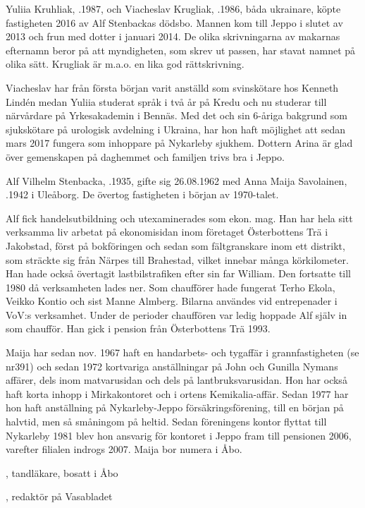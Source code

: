 %
Yuliia Kruhliak, .1987, och Viacheslav Krugliak, .1986, båda ukrainare, köpte fastigheten 2016 av Alf Stenbackas dödsbo. Mannen kom till Jeppo i slutet av 2013 och frun med dotter i januari 2014. De olika skrivningarna av makarnas efternamn beror på att myndigheten, som skrev ut passen, har stavat namnet på olika sätt. Krugliak är m.a.o. en lika god rättskrivning.
\begin{jhchildren}
  \item {}
\end{jhchildren}
Viacheslav har från första början varit anställd som svinskötare hos Kenneth Lindén medan Yuliia studerat språk i två år på Kredu och nu studerar till närvårdare på Yrkesakademin i Bennäs. Med det och sin 6-åriga bakgrund som sjukskötare på urologisk avdelning i Ukraina, har hon haft möjlighet att sedan mars 2017 fungera som inhoppare på Nykarleby sjukhem. Dottern Arina är glad över gemenskapen på daghemmet och familjen trivs bra i Jeppo.


%
Alf Vilhelm Stenbacka, .1935, gifte sig 26.08.1962 med Anna Maija Savolainen, .1942 i Uleåborg. De övertog fastigheten i början av 1970-talet.

Alf fick handelsutbildning och utexaminerades som ekon. mag. Han har hela sitt verksamma liv arbetat på ekonomisidan inom företaget Österbottens Trä i Jakobstad, först på bokföringen och sedan som fältgranskare inom ett distrikt, som sträckte sig från Närpes till Brahestad, vilket innebar många körkilometer. Han hade också övertagit lastbilstrafiken efter sin far William. Den fortsatte till 1980 då verksamheten lades ner. Som chaufförer hade fungerat Terho Ekola, Veikko Kontio och sist Manne Almberg. Bilarna användes vid entrepenader i VoV:s verksamhet. Under de perioder chauffören var ledig hoppade Alf själv in som chaufför. Han gick i pension från Österbottens Trä 1993.

Maija har sedan nov. 1967 haft en handarbets- och tygaffär i grannfastigheten (se nr391) och sedan 1972 kortvariga anställningar på John och Gunilla Nymans affärer, dels inom matvarusidan och dels på lantbruksvarusidan. Hon har också haft korta inhopp i Mirkakontoret och i ortens Kemikalia-affär. Sedan 1977 har hon  haft anställning på Nykarleby-Jeppo försäkringsförening, till en början på halvtid, men så småningom på heltid. Sedan föreningens kontor flyttat till Nykarleby 1981 blev hon ansvarig för kontoret i Jeppo fram till pensionen 2006, varefter filialen indrogs 2007. Maija bor numera i Åbo.
\begin{jhchildren}
  \item {}, tandläkare, bosatt i Åbo
  \item {}, redaktör på Vasabladet
\end{jhchildren}


